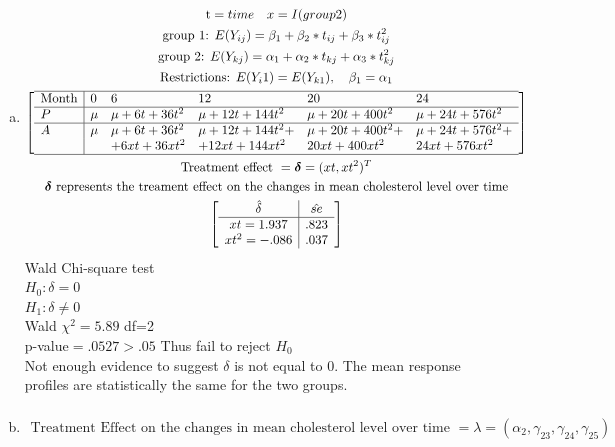 \documentclass{article}
\newcommand{\B}{\beta}
\begin{document}
\begin{flushleft}
\begin{enumerate}[(a)]
\item
\begin{multline*}\\
\text{t}=time \quad x=I(group2)\\
\text{group 1: } E(Y_{ij})=\B_1+\B_2*t_{ij}+\B_3*t_{ij}^2\\
\text{group 2: } E(Y_{kj})=\alpha_1+\alpha_2*t_{kj}+\alpha_3*t_{kj}^2\\
\text{Restrictions: } E(Y_i1)=E(Y_{k1}), \quad \B_1=\alpha_1\\
\left[\begin{array}{l|lllll}
	\hline
	\text{Month} &  0 & 6 & 12 & 20 &24\\
	\hline
	P & \mu &\mu+6t+36t^2 & \mu+12t+144t^2& \mu+20t+400t^2 &\mu+24t+576t^2\\
	\hline
	A & \mu &\mu+6t+36t^2 & \mu+12t+144t^2+& \mu+20t+400t^2+ &\mu+24t+576t^2+\\
	& & +6xt+36xt^2 &+12xt+144xt^2 &20xt+400xt^2&24xt+576xt^2\\
	\hline
	\end{array}\right]\\
	\text{Treatment effect }=\boldsymbol{\delta}=(xt,xt^2)^T\\
	\boldsymbol{\delta} \text{ represents the treament effect on the changes in mean cholesterol level over time}\\
	\left[\begin{array}{c|c}
	\hat{\delta}&\hat{se}\\
	\hline
	xt=1.937 & .823\\
	xt^2=-.086 & .037\\
	\end{array}\right]\\
	\end{multline*}
	Wald Chi-square test\\
	$H_0:\delta=0$\\
	$H_1:\delta\neq 0$\\
	Wald $\chi^2=5.89$ df=2\\
	p-value$=.0527>.05$ Thus fail to reject $H_0$\\
	Not enough evidence to suggest $\delta$ is not equal to 0. The mean response profiles are statistically the same for the two groups.\\
	\item
\begin{multline*}\\
\text{Treatment Effect on the changes in mean cholesterol level over time }=\lambda=(\alpha_2,\gamma_{23},\gamma_{24},\gamma_{25})\\

\end{multline*}
\end{enumerate}
\end{flushleft}
\end{document}
